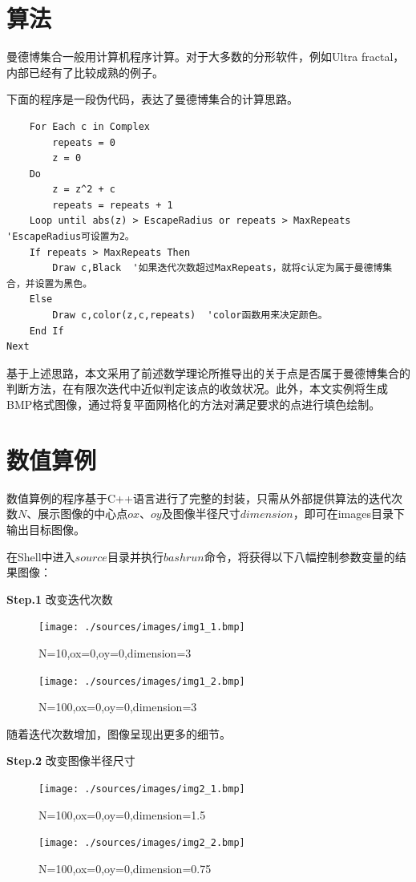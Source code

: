 \documentclass{ctexart}
\begin{document}
\section{算法}
曼德博集合一般用计算机程序计算。对于大多数的分形软件，例如Ultra fractal，内部已经有了比较成熟的例子。

下面的程序是一段伪代码，表达了曼德博集合的计算思路。

\begin{verbatim}
    For Each c in Complex
        repeats = 0
        z = 0
    Do
        z = z^2 + c
        repeats = repeats + 1
    Loop until abs(z) > EscapeRadius or repeats > MaxRepeats  'EscapeRadius可设置为2。
    If repeats > MaxRepeats Then
        Draw c,Black  '如果迭代次数超过MaxRepeats，就将c认定为属于曼德博集合，并设置为黑色。
    Else
        Draw c,color(z,c,repeats)  'color函数用来决定颜色。
    End If
Next
\end{verbatim}

基于上述思路，本文采用了前述数学理论所推导出的关于点是否属于曼德博集合的判断方法，在有限次迭代中近似判定该点的收敛状况。此外，本文实例将生成BMP格式图像，通过将复平面网格化的方法对满足要求的点进行填色绘制。

\section{数值算例}
数值算例的程序基于C++语言进行了完整的封装，只需从外部提供算法的迭代次数$N$、展示图像的中心点$ox$、$oy$及图像半径尺寸$dimension$，即可在images目录下输出目标图像。

在Shell中进入$source$目录并执行$bash run$命令，将获得以下八幅控制参数变量的结果图像：

\textbf{Step.1} 改变迭代次数

\begin{figure}[htb]
\centering
\begin{minipage}{0.48\linewidth}
\centering
\texttt{[image: ./sources/images/img1\_1.bmp]}
\caption{N=10,ox=0,oy=0,dimension=3}
\end{minipage}\hfill
\begin{minipage}{0.48\linewidth}
\centering
\texttt{[image: ./sources/images/img1\_2.bmp]}
\caption{N=100,ox=0,oy=0,dimension=3}
\end{minipage}
\end{figure}

随着迭代次数增加，图像呈现出更多的细节。

\textbf{Step.2} 改变图像半径尺寸

\begin{figure}[htb]
\centering
\begin{minipage}{0.48\linewidth}
\centering
\texttt{[image: ./sources/images/img2\_1.bmp]}
\caption{N=100,ox=0,oy=0,dimension=1.5}
\end{minipage}\hfill
\begin{minipage}{0.48\linewidth}
\centering
\texttt{[image: ./sources/images/img2\_2.bmp]}
\caption{N=100,ox=0,oy=0,dimension=0.75}
\end{minipage}
\end{figure}
\end{document}
